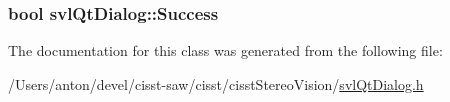\subsubsection[{Success}]{\setlength{\rightskip}{0pt plus 5cm}bool svl\+Qt\+Dialog\+::\+Success}\label{classsvl_qt_dialog_abb071021d600d1ddd5c4d331df8cb5b0}


The documentation for this class was generated from the following file\+:\begin{DoxyCompactItemize}
\item 
/\+Users/anton/devel/cisst-\/saw/cisst/cisst\+Stereo\+Vision/\hyperlink{svl_qt_dialog_8h}{svl\+Qt\+Dialog.\+h}\end{DoxyCompactItemize}
